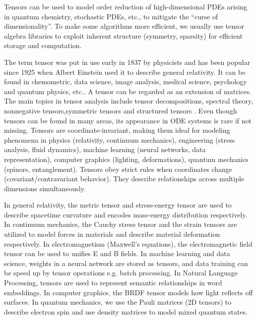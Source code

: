 \documentclass[11pt, oneside]{article}  %
\begin{document}
Tensors can be used to model order reduction of high-dimensional PDEs arising in quantum chemistry, stochastic PDEs, etc., to mitigate the 
``curse of dimensionality''. To make some algorithms more efficient, we usually use tensor algebra libraries to exploit inherent 
structure (symmetry, sparsity) for efficient storage and computation.
 
The term tensor was put in use early in 1837 by physicists and has been popular since 1925 when Albert Einstein used it to describe general 
relativity.  It can be found in chemometric, data science, image analysis, medical science, psychology and quantum physics, etc..  A tensor can 
be regarded as an extension of matrices.  The main topics in tensor analysis include tensor decompositions, spectral theory, nonnegative 
tensors,symmetric tensors\cite{cglm08,qi2013,qieig2005} and structured tensors \cite{qi2013,qieig2005,Xu2015}.  Even though tensors can be 
found in many areas, its appearance in ODE systems is rare if not missing.  Tensors are coordinate-invariant, making them ideal 
for modeling phenomena in physics (relativity, continuum mechanics), engineering (stress analysis, fluid dynamics), machine learning (neural 
networks, data representation), computer graphics (lighting, deformations),  quantum mechanics (spinors, entanglement).  Tensors obey strict 
rules when coordinates change (covariant/contravariant behavior). They describe relationships across multiple dimensions simultaneously.   

In general relativity, the metric tensor and stress-energy tensor are used to describe spacetime curvature and encodes mass-energy distribution 
respectively. In continuum mechanics,  the Cauchy stress tensor and the strain tensors are utilized to model forces in materials and describe 
material deformation respectively.  In electromagnetism (Maxwell's equations), the electromagnetic field tensor can be used to unifies E and B 
fields.  In machine learning and data science, weights in a neural network are stored as tensors, and data training can be speed up by tensor 
operations e.g. batch processing. In Natural Language Processing, tensors are used to represent semantic relationships in word embeddings. In 
computer graphics, the BRDF tensor models how light reflects off surfaces.  In quantum mechanics, we use the Pauli matrices (2D tensors) to 
describe electron spin and use density matrices to model mixed quantum states. 
  
\end{document}
